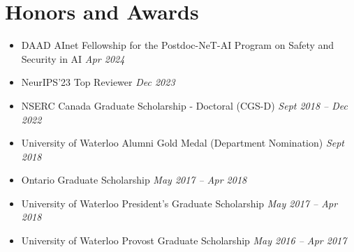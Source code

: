 \section*{Honors and Awards}
\vspace{\postsubhead}
\begin{adjustwidth}{\indentleft}{\indentright}
  \begin{itemize}
    \setlength\itemsep{0.1em}

    \item DAAD AInet Fellowship for the Postdoc-NeT-AI Program on Safety and Security in AI
    \hfill
    \textit{Apr 2024}
    

    \item NeurIPS'23 Top Reviewer
    \hfill
    \textit{Dec 2023}
    
    
    \item NSERC Canada Graduate Scholarship - Doctoral (CGS-D)
    \hfill
    \textit{Sept 2018 -- Dec 2022}
    
    \item University of Waterloo Alumni Gold Medal (Department Nomination)
    \hfill
    \textit{Sept 2018}
    
    \item Ontario Graduate Scholarship
    \hfill
    \textit{May 2017 -- Apr 2018}
    
    \item University of Waterloo President's Graduate Scholarship
    \hfill
    \textit{May 2017 -- Apr 2018}
    
    \item University of Waterloo Provost Graduate Scholarship
    \hfill
    \textit{May 2016 -- Apr 2017}
    
    
    
    
    
  \end{itemize}
\end{adjustwidth}
